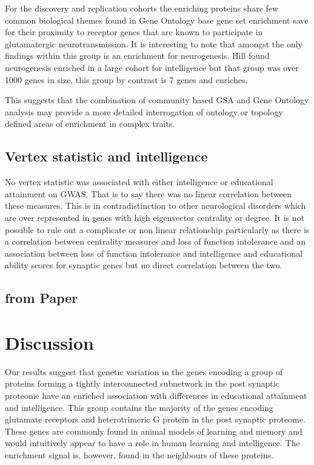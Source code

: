 For the discovery and replication cohorts the enriching proteins share few common biological themes found in Gene Ontology base gene set enrichment save for their proximity to receptor genes that are known to participate in glutamatergic neurotransmission. It is interesting to note that amongst the only findings within this group is an enrichment for neurogenesis. Hill found neurogenesis enriched in a large cohort for intelligence but that group was over 1000 genes in size, this group by contrast is 7 genes and enriches. 



This suggests that the combination of community based GSA and Gene Ontology analysis may provide a more detailed interrogation of ontology or topology defined areas of enrichment in complex traits. 


\subsection{Vertex statistic and intelligence}

No vertex statistic was associated with either intelligence or educational attainment on GWAS. That is to say there was no linear correlation between these measures. This is in contradistinction to other neurological disorders which are over represented in genes with high eigenvector centrality or degree. It is not possible to rule out a complicate or non linear relationship particularly as there is a correlation between centrality measures and loss of function intolerance and an association between loss of function intolerance and intelligence and educational ability scores for synaptic genes but no direct correlation between the two. 

\subsection{from Paper}

\section{Discussion}
Our results suggest that genetic variation in the genes encoding a group of proteins forming a tightly interconnected subnetwork in the post synaptic proteome have an enriched association with differences in educational attainment and intelligence. This group contains the majority of the genes encoding glutamate receptors and heterotrimeric G protein in the post synaptic proteome. These genes are commonly found in animal models of learning and memory and would intuitively appear to have a role in human learning and intelligence. The enrichment signal is, however, found in the neighbours of these proteins.

